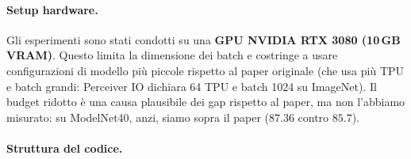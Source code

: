 \documentclass[
  11pt,
]{article}
\begin{document}
\paragraph{Setup hardware.} Gli esperimenti sono stati condotti su una \textbf{GPU NVIDIA RTX 3080 (10\,GB VRAM)}. Questo limita la dimensione dei batch e costringe a usare configurazioni di modello più piccole rispetto al paper originale (che usa più TPU e batch grandi: Perceiver IO dichiara 64 TPU e batch 1024 su ImageNet). Il budget ridotto è una causa plausibile dei gap rispetto al paper, ma non l'abbiamo misurato: su ModelNet40, anzi, siamo sopra il paper ($87.36$ contro $85.7$).

\paragraph{Struttura del codice.}
\end{document}

